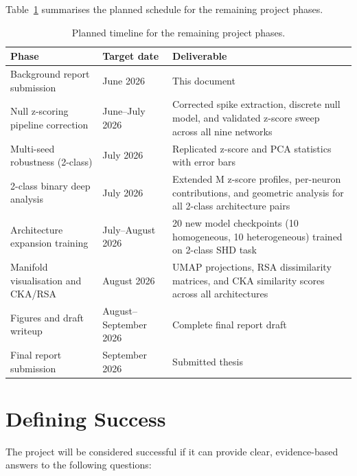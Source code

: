 \documentclass[12pt,twoside]{report}
\begin{document}
Table~\ref{tab:timeline} summarises the planned schedule for the 
remaining project phases.

\begin{table}[htb]
    \centering
    \small
    \begin{tabular}{p{5.5cm}|p{3cm}|p{5.5cm}}
        \textbf{Phase} & \textbf{Target date} & \textbf{Deliverable} \\ \hline
        Background report submission
            & June 2026
            & This document \\ \hline
        Null z-scoring pipeline correction
            & June--July 2026
            & Corrected spike extraction, discrete null model, and
              validated z-score sweep across all nine networks \\ \hline
        Multi-seed robustness (2-class)
            & July 2026
            & Replicated z-score and PCA statistics with error bars \\ \hline
        2-class binary deep analysis
            & July 2026
            & Extended M z-score profiles, per-neuron contributions, and
              geometric analysis for all 2-class architecture pairs \\ \hline
        Architecture expansion training
            & July--August 2026
            & 20 new model checkpoints (10 homogeneous, 10 heterogeneous)
              trained on 2-class SHD task \\ \hline
        Manifold visualisation and CKA/RSA
            & August 2026
            & UMAP projections, RSA dissimilarity matrices, and CKA
              similarity scores across all architectures \\ \hline
        Figures and draft writeup
            & August--September 2026
            & Complete final report draft \\ \hline
        Final report submission
            & September 2026
            & Submitted thesis \\
    \end{tabular}
    \caption{Planned timeline for the remaining project phases.}
    \label{tab:timeline}
\end{table}

\section{Defining Success}

The project will be considered successful if it can provide clear, 
evidence-based answers to the following questions:
\end{document}

